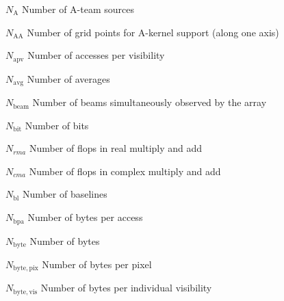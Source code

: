\documentclass[11pt,a4paper]{article}
\newcommand{\nbyteperpix}{N_\mathrm{byte,pix}} %
\newcommand{\nateam}{N_\mathrm{A}} %
\newcommand{\ngridpakern}{N_\mathrm{AA}} %
\newcommand{\naccvis}{N_\mathrm{apv}} %
\newcommand{\navg}{N_\mathrm{avg}} %
\newcommand{\nbeam}{N_\mathrm{beam}} %
\newcommand{\rma}{N_{rma}} %
\newcommand{\cma}{N_{cma}} %
\newcommand{\nbits}{N_\mathrm{bit}} %
\newcommand{\nbl}{N_\mathrm{bl}} %
\newcommand{\nbyteacc}{N_\mathrm{bpa}} %
\newcommand{\nbyte}{N_\mathrm{byte}} %
\newcommand{\nbytepervis}{N_\mathrm{byte,vis}} %
\begin{document}
\begin{basedescript}{\desclabelstyle{\pushlabel}\desclabelwidth{6em}}
  \vspace{-0.2cm}
\item[$\nateam$] Number of A-team sources \vspace{-0.2cm}
\item[$\ngridpakern$] Number of grid points for A-kernel support (along one
  axis) \vspace{-0.2cm}
\item[$\naccvis$] Number of accesses per visibility \vspace{-0.2cm}
\item[$\navg$] Number of averages\vspace{-0.2cm}
\item[$\nbeam$] Number of beams simultaneously observed by the array
  \vspace{-0.2cm}
\item[$\nbits$] Number of bits\vspace{-0.2cm}
\item[$\rma$] Number of flops in real multiply and add\vspace{-0.2cm}
\item[$\cma$] Number of flops in complex multiply and add\vspace{-0.2cm}
\item[$\nbl$] Number of baselines \vspace{-0.2cm}
\item[$\nbyteacc$] Number of bytes per access \vspace{-0.2cm}
\item[$\nbyte$] Number of bytes \vspace{-0.2cm}
\item[$\nbyteperpix$] Number of bytes per pixel \vspace{-0.2cm}
\item[$\nbytepervis$] Number of bytes per individual visibility 


\end{basedescript}
\end{document}
